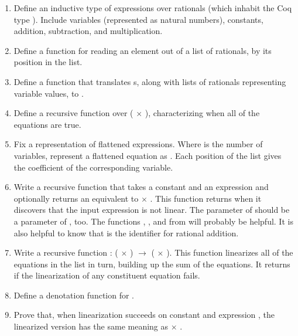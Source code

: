 \documentclass[12pt]{report}
\begin{document}
\begin{enumerate}
\begin{enumerate}
  \item Define an inductive type  of expressions over rationals (which inhabit the Coq type ).  Include variables (represented as natural numbers), constants, addition, subtraction, and multiplication.
  \item Define a function  for reading an element out of a list of rationals, by its position in the list.
  \item Define a function  that translates s, along with lists of rationals representing variable values, to .
  \item Define a recursive function  over  ( \ensuremath{\times} ), characterizing when all of the equations are true.
  \item Fix a representation  of flattened expressions.  Where  is the number of variables, represent a flattened equation as   .  Each position of the list gives the coefficient of the corresponding variable.
  \item Write a recursive function  that takes a constant  and an expression  and optionally returns an  equivalent to  \ensuremath{\times} .  This function returns  when it discovers that the input expression is not linear.  The parameter  of  should be a parameter of , too.  The functions , , and  from  will probably be helpful.  It is also helpful to know that  is the identifier for rational addition.
  \item Write a recursive function  :  ( \ensuremath{\times} ) \ensuremath{\rightarrow}  ( \ensuremath{\times} ).  This function linearizes all of the equations in the list in turn, building up the sum of the equations.  It returns  if the linearization of any constituent equation fails.
  \item Define a denotation function for .
  \item Prove that, when  linearization succeeds on constant  and expression , the linearized version has the same meaning as  \ensuremath{\times} .

\end{enumerate}
\end{enumerate}
\end{document}
